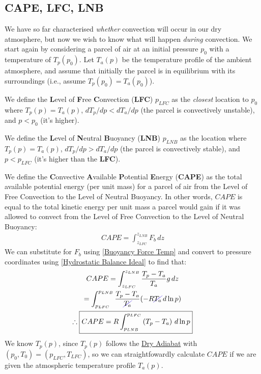 \subsection{CAPE, LFC, LNB}

We have so far characterised \textit{whether} convection will occur in our dry atmosphere, but now we wish to know what will happen \textit{during} convection. We start again by considering a parcel of air at an initial pressure \(p_0\) with a temperature of \(T_p(p_0)\). Let \(T_a(p)\) be the temperature profile of the ambient atmosphere, and assume that initially the parcel is in equilibrium with its surroundings (i.e., assume \(T_p(p_0)=T_a(p_0)\)).

We define the \textbf{L}evel of \textbf{F}ree \textbf{C}onvection (\textbf{LFC}) \(p_{LFC}\) as the \textit{closest} location to \(p_0\) where \(T_p(p)=T_a(p)\), \(dT_p/dp<dT_a/dp\) (the parcel is convectively unstable), and \(p<p_0\) (it's higher). 

We define the \textbf{L}evel of \textbf{N}eutral \textbf{B}uoyancy (\textbf{LNB}) \(p_{LNB}\) as the location where \(T_p(p)=T_a(p)\), \(dT_p/dp>dT_a/dp\) (the parcel is convectively stable), and \(p<p_{LFC}\) (it's higher than the \textbf{LFC}).

We define the \textbf{C}onvective \textbf{A}vailable \textbf{P}otential \textbf{E}nergy (\textbf{CAPE}) as the total available potential energy (per unit mass) for a parcel of air from the Level of Free Convection to the Level of Neutral Buoyancy. In other words, \(CAPE\) is equal to the total kinetic energy per unit mass a parcel would gain if it was allowed to convect from the Level of Free Convection to the Level of Neutral Buoyancy:
\begin{align}
    CAPE=\int_{z_{LFC}}^{z_{LNB}}F_b\,dz
\end{align}
We can substitute for \(F_b\) using \ref{Buoyancy Force Temp} and convert to pressure coordinates using \ref{Hydrostatic Balance Ideal} to find that:
\begin{gather*}
    CAPE=\int_{z_{LFC}}^{z_{LNB}}\frac{T_p-T_a}{T_a}g\,dz\\
    =\int_{p_{LFC}}^{p_{LNB}}\frac{T_p-T_a}{\Ccancel[mydarkblue]{T_a}}(-R\Ccancel[mydarkblue]{T_a}\,d\ln p)\\
    \therefore \boxed{CAPE=R\int_{p_{LNB}}^{p_{LFC}}\left( T_p-T_a \right)\,d\ln p}
\end{gather*}
We know \(T_p(p)\), since \(T_p(p)\) follows the \hyperref[Dry Adiabat]{Dry Adiabat} with \((p_0,T_0)=(p_{LFC},T_{LFC})\), so we can straightfowardly calculate \(CAPE\) if we are given the atmospheric temperature profile \(T_a(p)\).

